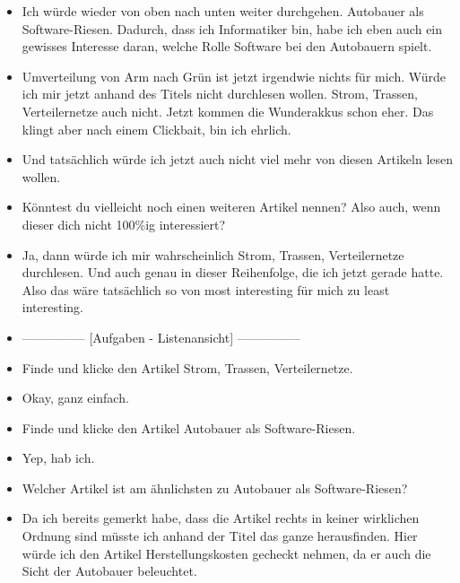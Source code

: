 {\begin{itemize}[]
              Also \flqq Fürs Klima und gegen China\frqq{} würde ich mir durchlesen, weil ich das gut finde, wenn wir halt vielleicht nicht so abhängig sind von anderen Staaten, was E-Mobilität angeht.
        \item {} Ich würde wieder von oben nach unten weiter durchgehen.
              \flqq Autobauer als Software-Riesen\frqq{}.
              Dadurch, dass ich Informatiker bin, habe ich eben auch ein gewisses Interesse daran, welche Rolle Software bei den Autobauern spielt.
        \item {} \flqq Umverteilung von Arm nach Grün\frqq{} ist jetzt irgendwie nichts für mich. Würde ich mir jetzt anhand des Titels nicht durchlesen wollen.
              \flqq Strom, Trassen, Verteilernetze\frqq{} auch nicht.
              \flqq Jetzt kommen die Wunderakkus\frqq{} schon eher.
              Das klingt aber nach einem Clickbait, bin ich ehrlich.
        \item {} Und tatsächlich würde ich jetzt auch nicht viel mehr von diesen Artikeln lesen wollen.
        \item {} Könntest du vielleicht noch einen weiteren Artikel nennen? Also auch, wenn dieser dich nicht 100\%ig interessiert?
        \item {} Ja, dann würde ich mir wahrscheinlich \flqq Strom, Trassen, Verteilernetze\frqq{} durchlesen.
              Und auch genau in dieser Reihenfolge, die ich jetzt gerade hatte.
              Also das wäre tatsächlich so von most interesting für mich zu least interesting.
        \item {---------------} [Aufgaben - Listenansicht] {---------------}
        \item {} Finde und klicke den Artikel \flqq Strom, Trassen, Verteilernetze\frqq{}.
        \item {} Okay, ganz einfach.
        \item {} Finde und klicke den Artikel \flqq Autobauer als Software-Riesen\frqq{}.
        \item {} Yep, hab ich.
        \item {} Welcher Artikel ist am ähnlichsten zu \flqq Autobauer als Software-Riesen\frqq{}?
        \item {} Da ich bereits gemerkt habe, dass die Artikel rechts in keiner wirklichen Ordnung sind müsste ich anhand der Titel das ganze herausfinden.
        Hier würde ich den Artikel \flqq Herstellungskosten gecheckt\frqq{} nehmen, da er auch die Sicht der Autobauer beleuchtet.

\end{itemize}}
